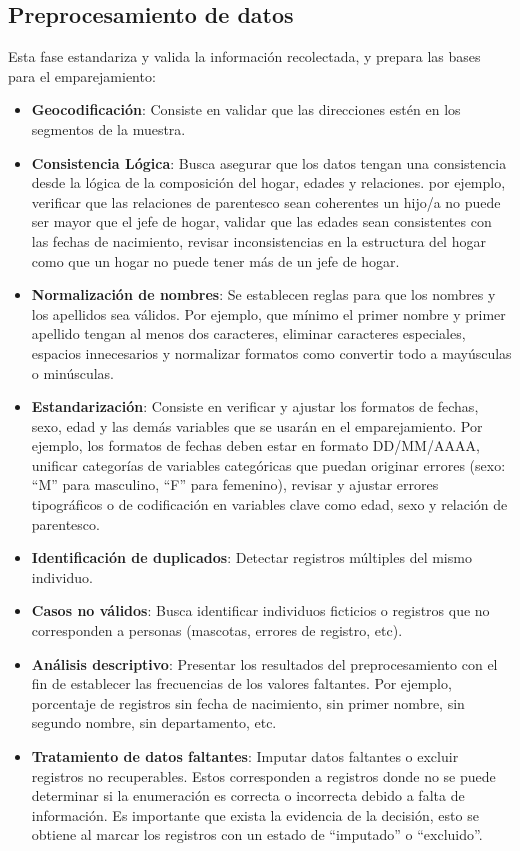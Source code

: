 \documentclass[
  12pt,
]{book}
\providecommand{\tightlist}{%
  \setlength{\itemsep}{0pt}\setlength{\parskip}{0pt}}
\begin{document}
\subsection{Preprocesamiento de datos}\label{preprocesamiento-de-datos}

Esta fase estandariza y valida la información recolectada, y prepara las bases para el emparejamiento:

\begin{itemize}
\tightlist
\item
  \textbf{Geocodificación}: Consiste en validar que las direcciones estén en los segmentos de la muestra.
\item
  \textbf{Consistencia Lógica}: Busca asegurar que los datos tengan una consistencia desde la lógica de la composición del hogar, edades y relaciones. por ejemplo, verificar que las relaciones de parentesco sean coherentes un hijo/a no puede ser mayor que el jefe de hogar, validar que las edades sean consistentes con las fechas de nacimiento, revisar inconsistencias en la estructura del hogar como que un hogar no puede tener más de un jefe de hogar.
\item
  \textbf{Normalización de nombres}: Se establecen reglas para que los nombres y los apellidos sea válidos. Por ejemplo, que mínimo el primer nombre y primer apellido tengan al menos dos caracteres, eliminar caracteres especiales, espacios innecesarios y normalizar formatos como convertir todo a mayúsculas o minúsculas.
\item
  \textbf{Estandarización}: Consiste en verificar y ajustar los formatos de fechas, sexo, edad y las demás variables que se usarán en el emparejamiento. Por ejemplo, los formatos de fechas deben estar en formato DD/MM/AAAA, unificar categorías de variables categóricas que puedan originar errores (sexo: ``M'' para masculino, ``F'' para femenino), revisar y ajustar errores tipográficos o de codificación en variables clave como edad, sexo y relación de parentesco.
\item
  \textbf{Identificación de duplicados}: Detectar registros múltiples del mismo individuo.
\item
  \textbf{Casos no válidos}: Busca identificar individuos ficticios o registros que no corresponden a personas (mascotas, errores de registro, etc).
\item
  \textbf{Análisis descriptivo}: Presentar los resultados del preprocesamiento con el fin de establecer las frecuencias de los valores faltantes. Por ejemplo, porcentaje de registros sin fecha de nacimiento, sin primer nombre, sin segundo nombre, sin departamento, etc.
\item
  \textbf{Tratamiento de datos faltantes}: Imputar datos faltantes o excluir registros no recuperables. Estos corresponden a registros donde no se puede determinar si la enumeración es correcta o incorrecta debido a falta de información. Es importante que exista la evidencia de la decisión, esto se obtiene al marcar los registros con un estado de ``imputado'' o ``excluido''.
\end{itemize}
\end{document}
